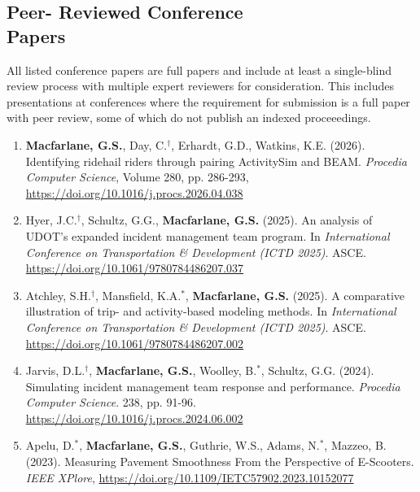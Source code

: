 \documentclass[margin,line]{res}
\newif\ifdetail{}
\newcounter{enuminitialize}
\newenvironment{myenum}[1][]
{%
 \setcounter{enuminitialize}{#1}
 \addtocounter{enuminitialize}{2}
 \begin{enumerate}[left= 4pt, itemsep=8pt, start=\value{enuminitialize}, label=\arabic*\addtocounter{enumi}{-2}]
}
{%
 \end{enumerate}
}
\begin{document}
\begin{resume}
\section{Peer- Reviewed Conference \\ Papers}
All listed conference papers are full papers and include at least a
single-blind review process with multiple expert reviewers for consideration.
This includes presentations at conferences where the requirement for submission is a full paper
with peer review, some of which do not publish an indexed proceeedings.
\ifdetail Papers 1 and 2 resulted from my undergraduate honors thesis, papers 3 through 5 work completed in graduate school, and subsequent work since joining the faculty at BYU. The marking $^\dagger$indicates BYU graduate student authors, $^*$indicates BYU undergraduate authors.\fi
\vspace{.3cm}
\begin{myenum}[14]
  \ifdetail{\color{NavyBlue} \fi
  \item \textbf{Macfarlane, G.S.}, Day, C.$^\dagger$,  Erhardt, G.D., Watkins, K.E. (2026). Identifying ridehail riders through pairing ActivitySim and BEAM. \textit{Procedia Computer Science}, Volume 280, pp. 286-293, \url{https://doi.org/10.1016/j.procs.2026.04.038}
\ifdetail } \fi

  \item Hyer, J.C.$^\dagger$, Schultz, G.G., \textbf{Macfarlane, G.S.} (2025). An analysis
  of UDOT’s expanded incident management team program. In \textit{International Conference on Transportation \& Development (ICTD 2025)}. ASCE. \url{https://doi.org/10.1061/9780784486207.037} 

  \item Atchley, S.H.$^\dagger$, Mansfield, K.A.$^*$, \textbf{Macfarlane, G.S.}
  (2025). A comparative illustration of trip- and activity-based modeling
  methods. In \textit{International Conference on Transportation \& Development (ICTD 2025)}. ASCE. \url{https://doi.org/10.1061/9780784486207.002}

\item Jarvis, D.L.$^\dagger$, \textbf{Macfarlane, G.S.}, Woolley, B.$^*$,
Schultz, G.G. (2024). Simulating incident management team response and
performance. \textit{Procedia Computer Science}. 238,
pp. 91-96.
\url{https://doi.org/10.1016/j.procs.2024.06.002}

\item Apelu, D.$^*$, \textbf{Macfarlane, G.S.}, Guthrie, W.S., Adams, N.$^*$,
Mazzeo, B. (2023). Measuring Pavement Smoothness From the Perspective of
E-Scooters. \textit{IEEE XPlore},
\url{https://doi.org/10.1109/IETC57902.2023.10152077}


\end{myenum}
\end{resume}
\end{document}
